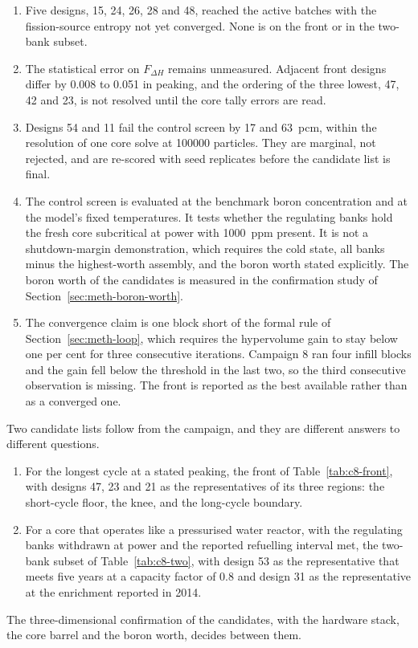 \begin{enumerate}
  \item Five designs, 15, 24, 26, 28 and 48, reached the active
        batches with the fission-source entropy not yet converged. None
        is on the front or in the two-bank subset.

  \item The statistical error on $F_{\Delta H}$ remains unmeasured.
        Adjacent front designs differ by 0.008 to 0.051 in peaking, and
        the ordering of the three lowest, 47, 42 and 23, is not
        resolved until the core tally errors are read.

  \item Designs 54 and 11 fail the control screen by 17 and
        \SI{63}{pcm}, within the resolution of one core solve at
        \num{100000} particles. They are marginal, not rejected, and
        are re-scored with seed replicates before the candidate list is
        final.

  \item The control screen is evaluated at the benchmark boron
        concentration and at the model's fixed temperatures. It tests
        whether the regulating banks hold the fresh core subcritical at
        power with \SI{1000}{ppm} present. It is not a shutdown-margin
        demonstration, which requires the cold state, all banks minus
        the highest-worth assembly, and the boron worth stated
        explicitly. The boron worth of the candidates is measured in
        the confirmation study of Section~\ref{sec:meth-boron-worth}.

  \item The convergence claim is one block short of the formal rule of
        Section~\ref{sec:meth-loop}, which requires the hypervolume
        gain to stay below one per cent for three consecutive
        iterations. Campaign 8 ran four infill blocks and the gain fell
        below the threshold in the last two, so the third consecutive
        observation is missing. The front is reported as the best
        available rather than as a converged one.
\end{enumerate}

Two candidate lists follow from the campaign, and they are different
answers to different questions.

\begin{enumerate}
  \item For the longest cycle at a stated peaking, the front of
        Table~\ref{tab:c8-front}, with designs 47, 23 and 21 as the
        representatives of its three regions: the short-cycle floor,
        the knee, and the long-cycle boundary.

  \item For a core that operates like a pressurised water reactor,
        with the regulating banks withdrawn at power and the reported
        refuelling interval met, the two-bank subset of
        Table~\ref{tab:c8-two}, with design 53 as the representative
        that meets five years at a capacity factor of 0.8 and design 31
        as the representative at the enrichment reported in 2014.
\end{enumerate}

The three-dimensional confirmation of the candidates, with the
hardware stack, the core barrel and the boron worth, decides between
them.

